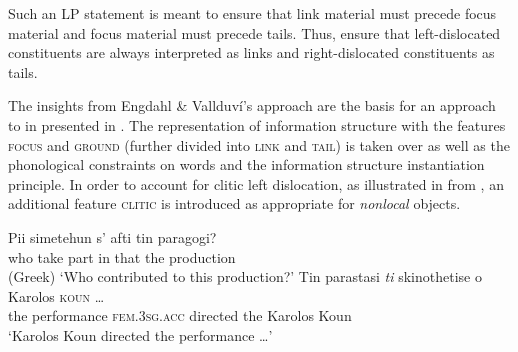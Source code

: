 \documentclass[output=paper,biblatex,babelshorthands,newtxmath,draftmode,colorlinks,citecolor=brown]{langscibook}
\begin{document}
  \label{fig:lp-catalan}
\z
Such an LP statement is meant to ensure that link material must precede
focus material and focus material must precede tails. Thus,
\citet{EV96a} ensure that left-dislocated constituents are always
interpreted as links and right-dislocated constituents as tails.

The insights from Engdahl \& Vallduví's approach are the basis for an
approach to  in  presented in
. The representation of information structure with the
features \textsc{focus} and \textsc{ground} (further divided into
\textsc{link} and \textsc{tail}) is taken over as well as the
phonological constraints on words and the information structure
instantiation principle. In order to account for clitic left
dislocation, as illustrated in  from , an
additional feature \textsc{clitic} is introduced as appropriate for
\textit{nonlocal} objects.

\begin{exe}
  \ex\label{ex:clld-greek}
  \begin{xlist}
    \ex \gll Pii simetehun s' afti tin paragogi?\\
             who {take part} in that the production\\\hfill(Greek)
    \trans `Who contributed to this production?'
    \ex \gll Tin parastasi \textit{ti} skinothetise o Karolos \textsc{koun} \ldots\\
    the performance  \textsc{fem.3sg.acc} directed the Karolos Koun\\
   \trans `Karolos Koun directed the performance \ldots'
  \end{xlist}
\end{exe}
\end{document}
